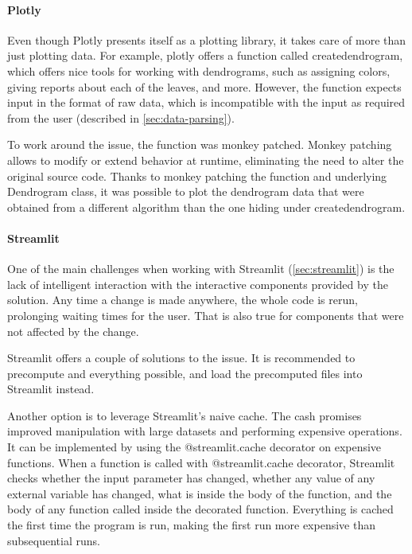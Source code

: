 \paragraph{Plotly}
\label{sec:plotlych}
Even though Plotly presents itself as a plotting library, it takes care of more than just plotting data. For example, plotly offers a function called create\textunderscore dendrogram, which offers nice tools for working with dendrograms, such as assigning colors, giving reports about each of the leaves, and more. However, the function expects input in the format of raw data, which is incompatible with the input as required from the user (described in \ref{sec:data-parsing}). 

To work around the issue, the function was monkey patched. Monkey patching allows to modify or extend behavior at runtime, eliminating the need to alter the original source code. Thanks to monkey patching the function and underlying Dendrogram class, it was possible to plot the dendrogram data that were obtained from a different algorithm than the one hiding under create\textunderscore dendrogram. 

\paragraph{Streamlit}
\label{sec:st3}
One of the main challenges when working with Streamlit (\ref{sec:streamlit}) is the lack of intelligent interaction with the interactive components provided by the solution. Any time a change is made anywhere, the whole code is rerun, prolonging waiting times for the user. That is also true for components that were not affected by the change. 

Streamlit offers a couple of solutions to the issue. It is recommended to precompute and everything possible, and load the precomputed files into Streamlit instead. 

Another option is to leverage Streamlit's naive cache. The cash promises improved manipulation with large datasets and performing expensive operations. It can be implemented by using the @streamlit.cache decorator on expensive functions. When a function is called with @streamlit.cache decorator, Streamlit checks whether the input parameter has changed, whether any value of any external variable has changed, what is inside the body of the function, and the body of any function called inside the decorated function. Everything is cached the first time the program is run, making the first run more expensive than subsequential runs. 

